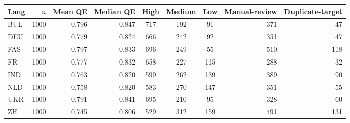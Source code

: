 \begin{tabular}{@{}lrrrcccrr@{}}
\toprule
Lang & $n$ & Mean QE & Median QE & High & Medium & Low & Manual-review & Duplicate-target \\
\midrule
BUL & 1000 & 0.796 & 0.847 & 717 & 192 & 91 & 371 & 47 \\
DEU & 1000 & 0.779 & 0.824 & 666 & 242 & 92 & 351 & 47 \\
FAS & 1000 & 0.797 & 0.833 & 696 & 249 & 55 & 510 & 118 \\
FR & 1000 & 0.777 & 0.832 & 658 & 227 & 115 & 288 & 32 \\
IND & 1000 & 0.763 & 0.820 & 599 & 262 & 139 & 389 & 90 \\
NLD & 1000 & 0.758 & 0.820 & 583 & 270 & 147 & 351 & 55 \\
UKR & 1000 & 0.791 & 0.841 & 695 & 210 & 95 & 328 & 60 \\
ZH & 1000 & 0.745 & 0.806 & 529 & 312 & 159 & 491 & 131 \\
\bottomrule
\end{tabular}
